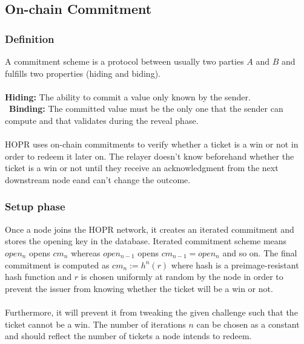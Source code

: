\subsection{On-chain Commitment}

\subsubsection*{Definition}
A commitment scheme is a protocol between usually two parties $A$ and $B$ and fulfills two properties (hiding and biding).
\\~\\\textbf{Hiding:} The ability to commit a value only known by the sender.
\\~\textbf{Binding:} The committed value must be the only one that the sender can compute and that validates during the reveal phase.
\\~\\HOPR uses on-chain commitments to verify whether a ticket is a win or not in order to redeem it later on. The relayer doesn't know beforehand whether the ticket is a win or not until they receive an acknowledgment from the next downstream node eand can't change the outcome.
\subsubsection{Setup phase}
Once a node joins the HOPR network, it creates an iterated commitment and stores the opening key in the database.
Iterated commitment scheme means $open_n$ opens $cm_n$ whereas $open_{n-1}$ opens $cm_{n-1}=open_n$ and so on.
\newline The final commitment is computed as $cm_n:= h^n(r)$ where hash is a preimage-resistant hash function and
$r$ is chosen uniformly at random by the node in order to prevent the issuer from knowing whether the ticket will be a win or not.
\\~\\ Furthermore, it will prevent it from tweaking the given challenge such that the ticket cannot be a win.
The number of iterations $n$ can be chosen as a constant and should reflect the number of tickets a node intends to redeem.


